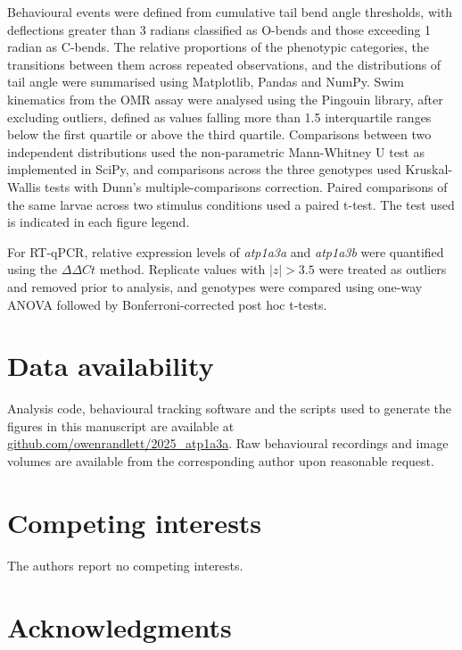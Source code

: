 \documentclass[9.5pt,lineno]{RandlettLab_elife}
\begin{document}
Behavioural events were defined from cumulative tail bend angle thresholds, with deflections greater than 3 radians classified as O-bends and those exceeding 1 radian as C-bends.
The relative proportions of the phenotypic categories, the transitions between them across repeated observations, and the distributions of tail angle were summarised using Matplotlib, Pandas and NumPy.
Swim kinematics from the OMR assay were analysed using the Pingouin library, after excluding outliers, defined as values falling more than 1.5 interquartile ranges below the first quartile or above the third quartile.
Comparisons between two independent distributions used the non-parametric Mann-Whitney U test as implemented in SciPy, and comparisons across the three genotypes used Kruskal-Wallis tests with Dunn's multiple-comparisons correction. Paired comparisons of the same larvae across two stimulus conditions used a paired t-test. The test used is indicated in each figure legend.

For RT-qPCR, relative expression levels of \emph{atp1a3a} and \emph{atp1a3b} were quantified using the $\Delta\Delta Ct$ method.
Replicate values with $|z| > 3.5$ were treated as outliers and removed prior to analysis, and genotypes were compared using one-way ANOVA followed by Bonferroni-corrected post hoc t-tests.


\section{Data availability}
Analysis code, behavioural tracking software and the scripts used to generate the figures in this manuscript are available at \href{https://github.com/owenrandlett/2025_atp1a3a}{github.com/owenrandlett/2025\_atp1a3a}.
Raw behavioural recordings and image volumes are available from the corresponding author upon reasonable request.

\section{Competing interests}
The authors report no competing interests.

\section{Acknowledgments}
\end{document}
